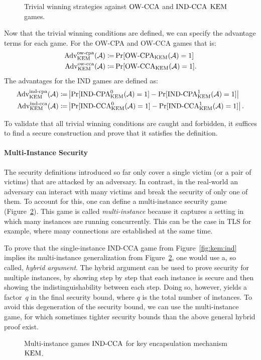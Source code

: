 \begin{figure}[!ht]%
    \centering
    
    \caption{Trivial winning strategies against ${\mathrm{OW}\text{-}\mathrm{CCA}}$ and ${\mathrm{IND}\text{-}\mathrm{CCA}}$ $\mathrm{KEM}$ games.}
    \label{kem:triv}
\end{figure}

Now that the trivial winning conditions are defined, we can specify the advantage terms for each game.
For the OW-CPA and OW-CCA games that is:
\begin{align*}
    \mathrm{Adv}_{\mathrm{KEM}}^{\mathrm{ow}\text{-}\mathrm{cpa}}(\mathcal{A})\coloneqq&\Pr[{\mathrm{OW}\text{-}\mathrm{CPA}}_{\mathrm{KEM}}(\mathcal{A})=1]\\
    \mathrm{Adv}_{\mathrm{KEM}}^{\mathrm{ow}\text{-}\mathrm{cca}}(\mathcal{A})\coloneqq&\Pr[{\mathrm{OW}\text{-}\mathrm{CCA}}_{\mathrm{KEM}}(\mathcal{A})=1]\text{.}
\end{align*}
The advantages for the IND games are defined as:
\begin{align*}
    \mathrm{Adv}_{\mathrm{KEM}}^{\mathrm{ind}\text{-}\mathrm{cpa}}(\mathcal{A})\coloneqq&\left|\Pr[{\mathrm{IND}\text{-}\mathrm{CPA}}_{\mathrm{KEM}}^0(\mathcal{A})=1]-\Pr[{\mathrm{IND}\text{-}\mathrm{CPA}}_{\mathrm{KEM}}^1(\mathcal{A})=1]\right|\\
    \mathrm{Adv}_{\mathrm{KEM}}^{\mathrm{ind}\text{-}\mathrm{cca}}(\mathcal{A})\coloneqq&\left|\Pr[{\mathrm{IND}\text{-}\mathrm{CCA}}_{\mathrm{KEM}}^0(\mathcal{A})=1]-\Pr[{\mathrm{IND}\text{-}\mathrm{CCA}}_{\mathrm{KEM}}^1(\mathcal{A})=1]\right|\text{.}
\end{align*}

To validate that all trivial winning conditions are caught and forbidden, it suffices to find a secure construction and prove that it satisfies the definition.

\paragraph{Multi-Instance Security}
The security definitions introduced so far only cover a single victim (or a pair of victims) that are attacked by an adversary.
In contrast, in the real-world an adversary can interact with many victims and break the security of only one of them.
To account for this, one can define a multi-instance security game (Figure~\ref{fig:kem:ind:mi:corrupt}).
This game is called \emph{multi-instance} because it captures a setting in which many instances are running concurrently.
This can be the case in TLS for example, where many connections are established at the same time.

To prove that the single-instance IND-CCA game from Figure~\ref{fig:kem:ind} implies its multi-instance generalization from Figure~\ref{fig:kem:ind:mi:corrupt}, one would use a, so called, \emph{hybrid argument}.
The hybrid argument can be used to prove security for multiple instances, by showing step by step that each instance is secure and then showing the indistinguishability between each step.
Doing so, however, yields a factor~$q$ in the final security bound, where $q$ is the total number of instances.
To avoid this degeneration of the security bound, we can use the multi-instance game, for which sometimes tighter security bounds than the above general hybrid proof exist.

\begin{figure}[!ht]
    \centering
    \nicoresetlinenr%
    \fbox{%
        \scalebox{\codescalefactor}{%
        }%
    }
    \caption{%
        Multi-instance games ${\mathrm{IND}\text{-}\mathrm{CCA}}$ for key encapsulation mechanism~$\mathrm{KEM}$.
    }
    \label{fig:kem:ind:mi:corrupt}
\end{figure}